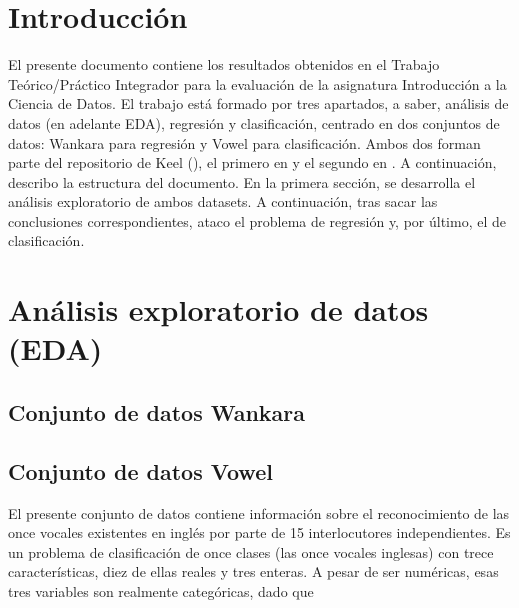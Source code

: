 
\section{Introducción}


El presente documento contiene los resultados obtenidos en el Trabajo Teórico/Práctico Integrador para la evaluación de la asignatura Introducción a la Ciencia de Datos. El trabajo está formado por tres apartados, a saber, análisis de datos (en adelante EDA), regresión y clasificación, centrado en dos conjuntos de datos: Wankara para regresión y Vowel para clasificación. Ambos dos forman parte del repositorio de Keel (\cite{keel}), el primero en \cite{wankara} y el segundo en \cite{vowel}. A continuación, describo la estructura del documento. En la primera sección, se desarrolla el análisis exploratorio de ambos datasets. A continuación, tras sacar las conclusiones correspondientes, ataco el problema de regresión y, por último, el de clasificación.







\section{Análisis exploratorio de datos (EDA)}

\subsection{Conjunto de datos Wankara}

\subsection{Conjunto de datos Vowel}

El presente conjunto de datos contiene información sobre el reconocimiento de las once vocales existentes en inglés por parte de 15 interlocutores independientes. Es un problema de clasificación de once clases (las once vocales inglesas) con trece características, diez de ellas reales y tres enteras. A pesar de ser numéricas, esas tres variables son realmente categóricas, dado que

